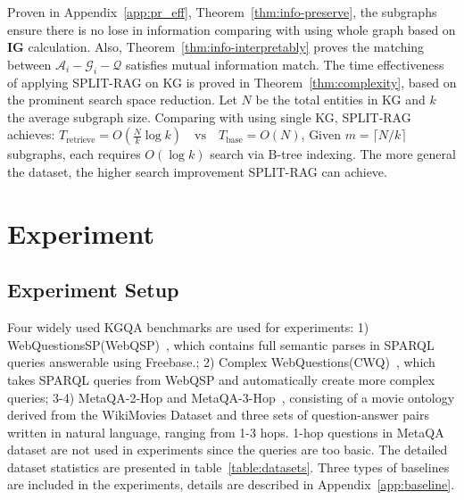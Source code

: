\documentclass[sigconf]{acmart}
\begin{document}
Proven in Appendix~\ref{app:pr_eff}, Theorem~\ref{thm:info-preserve}, the subgraphs ensure there is no lose in information comparing with using whole graph based on $\mathbf{IG}$ calculation. Also, Theorem~\ref{thm:info-interpretably} proves the matching between $\mathcal{A}_i-\mathcal{G}_i-\mathcal{Q}$ satisfies mutual information match. The time effectiveness of applying SPLIT-RAG on KG is proved in Theorem~\ref{thm:complexity}, based on the prominent search space reduction. Let $N$ be the total entities in KG and $k$ the average subgraph size. Comparing with using single KG, SPLIT-RAG achieves: $T_{\text{retrieve}} = O\left(\frac{N}{k} \log k\right) \quad \text{vs} \quad T_{\text{base}} = O(N)$, Given $m = \lceil N/k \rceil$ subgraphs, each requires $O(\log k)$ search via B-tree indexing. The more general the dataset, the higher search improvement SPLIT-RAG can achieve.





\section{Experiment}

\subsection{Experiment Setup}



Four widely used KGQA benchmarks are used for experiments: 1) WebQuestionsSP(WebQSP)~\cite{yih2016value}, which contains full semantic parses in SPARQL queries answerable using Freebase.; 2) Complex WebQuestions(CWQ)~\cite{talmor2018web}, which takes SPARQL queries from WebQSP and automatically create more complex queries; 3-4) MetaQA-2-Hop and MetaQA-3-Hop~\cite{zhang2018variational}, consisting of a movie ontology derived from the WikiMovies Dataset and three sets of question-answer pairs written in natural language, ranging from 1-3 hops. 1-hop questions in MetaQA dataset are not used in experiments since the queries are too basic. The detailed dataset statistics are presented in table~\ref{table:datasets}. Three types of baselines are included in the experiments, details are described in Appendix~\ref{app:baseline}.
\end{document}
